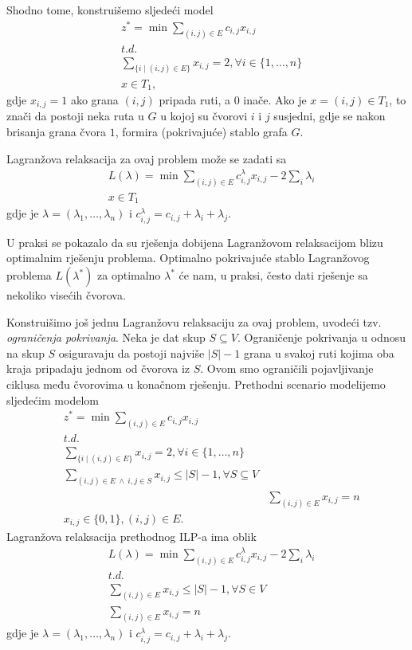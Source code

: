 \documentclass[a4paper, utf8, 11pt, colorlinks]{book}
\theoremstyle{definition}
\begin{document}
Shodno tome, konstruišemo sljedeći model
\begin{align*}
    &z^* = \min \sum_{(i,j)\in E} c_{i,j} x_{i,j}\\
    & t.d. \\
    & \sum_{ \{ i \mid (i,j) \in E \} } x_{i,j} = 2, \forall i \in \{1,\ldots, n \} \\
    & x \in T_1,
\end{align*}
gdje $x_{i,j} = 1$ ako grana $(i,j)$ pripada ruti, a 0 inače. Ako je $x=(i, j) \in T_1$, to znači da postoji neka ruta u $G$ u kojoj su čvorovi $i$ i $j$ susjedni, gdje se nakon brisanja grana čvora $1$, formira (pokrivajuće) stablo grafa $G$. 

Lagranžova relaksacija za ovaj problem može se zadati sa 
\begin{align*}
     &L(\lambda) = \min \sum_{(i,j)\in E} c^\lambda_{i,j} x_{i,j} - 2 \sum_{i} \lambda_i \\
     & x \in T_1
\end{align*}
gdje je $\lambda=(\lambda_1, \ldots, \lambda_n)$ i $c^\lambda_{i,j} = c_{i,j} + \lambda_i + \lambda_j$. 

U praksi se pokazalo da su rješenja dobijena Lagranžovom relaksacijom blizu optimalnim rješenju problema. Optimalno pokrivajuće stablo Lagranžovog problema $L(\lambda^*)$ za optimalno $\lambda^*$ će nam,  u praksi, često dati rješenje sa  nekoliko visećih čvorova. 

Konstruišimo još jednu Lagranžovu relaksaciju za ovaj problem,  uvodeći tzv. \emph{ograničenja pokrivanja}. Neka je dat skup $S\subseteq V$. Ograničenje pokrivanja u odnosu na skup $S$ osiguravaju da postoji najviše $|S|-1$ grana u svakoj ruti kojima oba kraja pripadaju jednom od čvorova iz $S$. Ovom smo ograničili pojavljivanje ciklusa među čvorovima u konačnom rješenju.
Prethodni scenario modelijemo sljedećim modelom 
\begin{align*}
     & z^* = \min \sum_{(i,j)\in E} c_{i,j} x_{i,j} \\
     & t.d. \\
     & \sum_{ \{ i \mid (i,j) \in E \} } x_{i,j} = 2, \forall i \in \{1,\ldots, n \} \\
     & \sum_{(i,j) \in E \ \wedge\ i,j \in S} x_{i,j} \leq |S|-1, \forall S \subseteq V \\
     &  & \sum_{(i,j) \in E} x_{i,j} = n \\
     & x_{i,j} \in \{0, 1 \}, (i,j)\in E.
\end{align*}
Lagranžova relaksacija prethodnog ILP-a ima oblik 
\begin{align*}
 &L(\lambda) = \min \sum_{(i,j)\in E} c^\lambda_{i,j} x_{i,j} - 2 \sum_{i} \lambda_i \\
 & t.d. \\
 & \sum_{(i,j) \in E} x_{i,j} \leq |S|-1, \forall S \in V \\
 & \sum_{(i,j) \in E} x_{i,j} = n
\end{align*}
gdje je $\lambda=(\lambda_1, \ldots, \lambda_n)$ i $c^\lambda_{i,j} = c_{i,j} + \lambda_i + \lambda_j$. 
\end{document}
